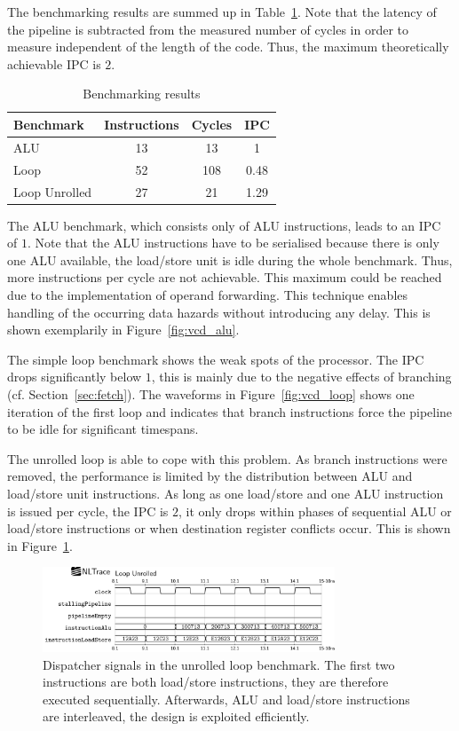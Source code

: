 \documentclass[conference]{IEEEtran}
\begin{document}
The benchmarking results are summed up in Table~\ref{tab:results}. Note that the latency of the pipeline is subtracted from the measured number of cycles in order to measure independent of the length of the code. Thus, the maximum theoretically achievable IPC is $2$.

\begin{table} [h]
	\caption{Benchmarking results}
	\centering
	\begin{tabular}{l c c c}
			Benchmark & Instructions & Cycles & IPC \\
		\midrule
			ALU & 13 & 13 & 1 \\
			Loop & 52 & 108 & 0.48 \\
			Loop Unrolled & 27 & 21 & 1.29
	\end{tabular}
	\label{tab:results}
\end{table}


The ALU benchmark, which consists only of ALU instructions, leads to an IPC of $1$. Note that the ALU instructions have to be serialised because there is only one ALU available, the load/store unit is idle during the whole benchmark. Thus, more instructions per cycle are not achievable. This maximum could be reached due to the implementation of operand forwarding. This technique enables handling of the occurring data hazards without introducing any delay. This is shown exemplarily in Figure~\ref{fig:vcd_alu}.

The simple loop benchmark shows the weak spots of the processor. The IPC drops significantly below $1$, this is mainly due to the negative effects of branching (cf. Section~\ref{sec:fetch}). The waveforms in Figure~\ref{fig:vcd_loop} shows one iteration of the first loop and indicates that branch instructions force the pipeline to be idle for significant timespans.

The unrolled loop is able to cope with this problem. As branch instructions were removed, the performance is limited by the distribution between ALU and load/store unit instructions. As long as one load/store and one ALU instruction is issued per cycle, the IPC is $2$, it only drops within phases of sequential ALU or load/store instructions or when destination register conflicts occur. This is shown in Figure~\ref{fig:vcd_loop_unrolled}.

\begin{figure}
	\centering
	\includegraphics[width=8.7cm]{vcd_loop_unrolled.png}
	\caption{Dispatcher signals in the unrolled loop benchmark. The first two instructions are both load/store instructions, they are therefore executed sequentially. Afterwards, ALU and load/store instructions are interleaved, the design is exploited efficiently.}
	\label{fig:vcd_loop_unrolled}
\end{figure}
\end{document}

